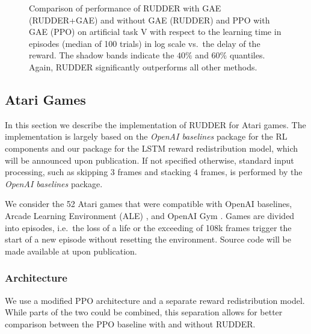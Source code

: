 \documentclass{article}
\newcommand{\figpath}{figures/}
\begin{document}
\begin{appendices}
\begin{figure}[h]
 \centering \resizebox{0.7\linewidth}{!}{}
\caption{Comparison of performance of RUDDER with GAE (RUDDER+GAE) and without GAE (RUDDER) and PPO with GAE (PPO) on artificial task V
with respect to the learning time in episodes (median of 100 trials) in log scale
vs.\ the delay of the reward.
The shadow bands indicate the $40\%$ and $60\%$ quantiles.
Again, RUDDER significantly outperforms all other methods.\label{fig:ppo}}\end{figure}



















\subsection{Atari Games}
\label{sec:Aatari}
In this section we describe the implementation of RUDDER for Atari games.
The implementation is largely based on the {\em OpenAI baselines}
package \cite{Dhariwal:17} for the RL components and our package
for the LSTM reward redistribution model, which will be announced upon publication.
If not specified otherwise, standard input processing, such as skipping $3$ frames and stacking $4$ frames, 
is performed by the {\em OpenAI baselines} package.

We consider the 52 Atari games that were compatible with OpenAI baselines,
Arcade Learning Environment (ALE) \cite{Bellemare:13}, and OpenAI Gym \cite{Brockman:16}.
Games are divided into episodes,
i.e.\ the loss of a life or the exceeding of 108k frames
trigger the start of a new episode without resetting the environment.
Source code will be made available at upon publication.

\subsubsection{Architecture}
\label{sec:Aatari-arch}
We use a modified PPO architecture and a separate reward redistribution model. While parts of the two could be combined, this separation allows for better comparison between the PPO baseline with and without RUDDER.


\end{appendices}
\end{document}
